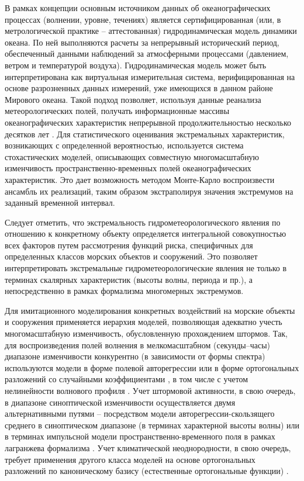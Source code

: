 В рамках концепции \citep{dk3} основным источником данных об океанографических процессах (волнении, уровне, течениях) является сертифицированная (или, в метрологической практике – аттестованная) гидродинамическая модель динамики океана. По ней выполняются расчеты за непрерывный исторический период, обеспеченный данными наблюдений за атмосферными процессами (давлением, ветром и температурой воздуха). Гидродинамическая модель может быть интерпретирована как виртуальная измерительная система, верифицированная на основе разрозненных данных измерений, уже имеющихся в данном районе Мирового океана. Такой подход позволяет, используя данные реанализа метеорологических полей, получать информационные массивы океанографических характеристик непрерывной продолжительностью несколько десятков лет \citep{dk4}. Для статистического оценивания экстремальных характеристик, возникающих с определенной вероятностью, используется система стохастических моделей, описывающих совместную многомасштабную изменчивость пространственно-временных полей океанографических характеристик. Это дает возможность методом Монте-Карло воспроизвести ансамбль их реализаций, таким образом экстраполируя значения экстремумов на заданный временной интервал.

Следует отметить, что экстремальность гидрометеорологического явления по отношению к конкретному объекту определяется интегральной совокупностью всех факторов путем рассмотрения функций риска, специфичных для определенных классов морских объектов и сооружений. Это позволяет интерпретировать экстремальные гидрометеорологические явления не только в терминах скалярных характеристик (высоты волны, периода и пр.), а непосредственно в рамках формализма многомерных экстремумов.

Для имитационного моделирования конкретных воздействий на морские объекты и сооружения применяется иерархия моделей, позволяющая адекватно учесть многомасштабную изменчивость, обусловленную прохождением штормов. Так, для воспроизведения полей волнения в мелкомасштабном (секунды--часы) диапазоне изменчивости конкурентно (в зависимости от формы спектра) используются модели в форме полевой авто\-регрессии \citep{dk6} или в форме ортогональных разложений со случайными коэффициентами \citep{dk7}, в том числе с учетом нелинейности волнового профиля \citep{dk8}. Учет штормовой активности, в свою очередь, в диапазоне синоптической изменчивости осуществляется двумя альтернативными путями – посредством модели авто\-регрессии-скользящего среднего \citep{dk9} в синоптическом диапазоне (в терминах характерной высоты волны) или в терминах импульсной модели пространственно-временного поля в рамках лагранжева формализма \citep{dk10}. Учет климатической неоднородности, в свою очередь, требует применения другого класса моделей на основе ортогональных разложений по каноническому базису (естественные ортогональные функции) \citep{dk11}.

